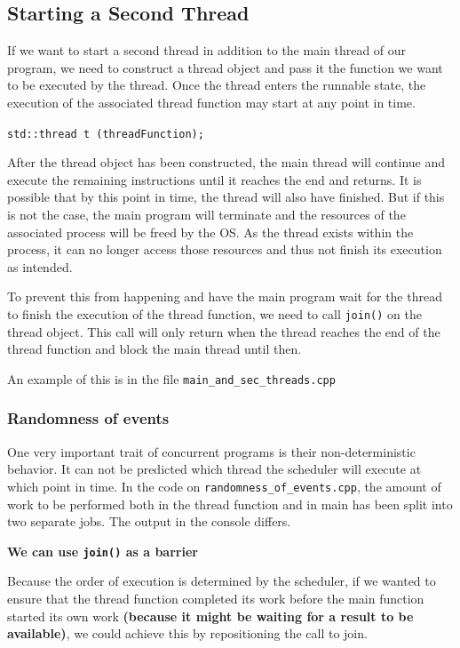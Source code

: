 \documentclass[11pt, a4paper]{article}
\begin{document}
\subsection{Starting a Second Thread}%
\label{sec:starting_a_second_thread}



If we want to start a second thread in addition to the main thread of our program, we need to construct a thread object and pass it the function we want to be executed by the thread. Once the thread enters the runnable state, the execution of the associated thread function may start at any point in time.

\texttt{std::thread t (threadFunction);} 


After the thread object has been constructed, the main thread will continue and execute the remaining instructions until it reaches the end and returns. It is possible that by this point in time, the thread will also have finished. But if this is not the case, the main program will terminate and the resources of the associated process will be freed by the OS. As the thread exists within the process, it can no longer access those resources and thus not finish its execution as intended.

To prevent this from happening and have the main program wait for the thread to finish the execution of the thread function, we need to call \texttt{join()} on the thread object. This call will only return when the thread reaches the end of the thread function and block the main thread until then.  

An example of this is in the file \texttt{main\_and\_sec\_threads.cpp}


\subsubsection{Randomness of events}%
\label{sub:randomness_of_events}

One very important trait of concurrent programs is their non-deterministic behavior. It can not be predicted which thread the scheduler will execute at which point in time. In the code on \texttt{randomness\_of\_events.cpp}, the amount of work to be performed both in the thread function and in main has been split into two separate jobs. The output in the console differs. 


\textbf{We can use \texttt{join()} as a barrier}

Because the order of execution is determined by the scheduler, if we wanted to ensure that the thread function completed its work before the main function started its own work \textbf{(because it might be waiting for a result to be available)}, we could achieve this by repositioning the call to join.
\end{document}
